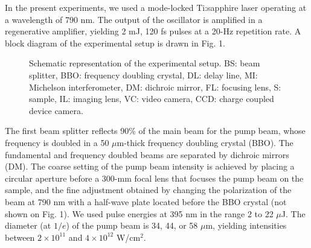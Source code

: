 \documentclass[aps,prb,reprint]{revtex4-2}
\begin{document}
In the present experiments, we used a mode-locked Ti:sapphire laser operating at a wavelength of 790 nm. The output of the oscillator is amplified in a regenerative amplifier, yielding 2 mJ, 120 fs pulses at a 20-Hz repetition rate. A block diagram of the experimental setup is drawn in Fig. 1.

\begin{figure}[ht]
    \centering
    \caption{Schematic representation of the experimental setup. BS: beam splitter, BBO: frequency doubling crystal, DL: delay line, MI: Michelson interferometer, DM: dichroic mirror, FL: focusing lens, S: sample, IL: imaging lens, VC: video camera, CCD: charge coupled device camera.}
    \label{fig:setup}
\end{figure}

The first beam splitter reflects 90\% of the main beam for the pump beam, whose frequency is doubled in a 50 $\mu$m-thick frequency doubling crystal (BBO). The fundamental and frequency doubled beams are separated by dichroic mirrors (DM). The coarse setting of the pump beam intensity is achieved by placing a circular aperture before a 300-mm focal lens that focuses the pump beam on the sample, and the fine adjustment obtained by changing the polarization of the beam at 790 nm with a half-wave plate located before the BBO crystal (not shown on Fig. 1). We used pulse energies at 395 nm in the range 2 to 22 $\mu$J. The diameter (at $1/e$) of the pump beam is 34, 44, or 58 $\mu$m, yielding intensities between $2\times10^{11}$ and $4\times10^{12}$ W/cm$^2$.
\end{document}
